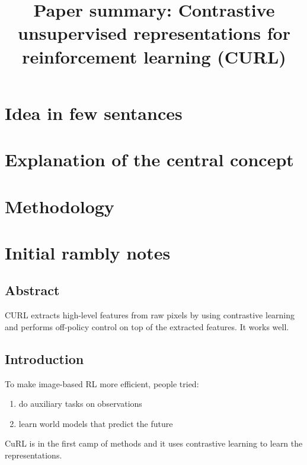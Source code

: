 \documentclass{article}
\title{Paper summary: Contrastive unsupervised representations for reinforcement learning (CURL)}
\begin{document}
\maketitle


\section{Idea in few sentances}



\section{Explanation of the central concept}




\section{Methodology}


\section{Initial rambly notes}


\subsection{Abstract}
CURL extracts high-level features from raw pixels by using contrastive learning
and performs off-policy control on top of the extracted features.
It works well.


\subsection{Introduction}
To make image-based RL more efficient, people tried:
\begin{enumerate}
		\item do auxiliary tasks on observations
		\item learn world models that predict the future
\end{enumerate}
CuRL is in the first camp of methods and it uses contrastive learning to learn the representations.
\end{document}
